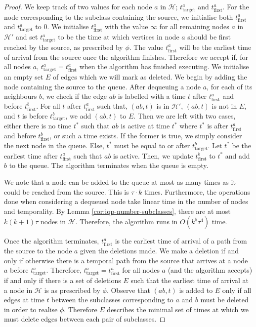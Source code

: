 \documentclass[preprint,12pt]{elsarticle}
\begin{document}
\begin{proof}
    We keep track of two values for each node $a$ in $\mathcal{H}$; $t^a_{\text{target}}$ and $t_{\text{first}}^a$. For the node corresponding to the subclass containing the source, we initialise both $t_{\text{first}}^a$ and $t_{\text{target}}^a$ to $0$. We initialise $t_{\text{first}}^a$ with the value $\infty$ for all remaining nodes $a$ in $\mathcal{H}'$ and set $t_{\text{target}}^a$ to be the time at which vertices in node $a$ should be first reached by the source, as prescribed by $\phi$. The value $t_{\text{first}}^a$ will be the earliest time of arrival from the source once the algorithm finishes. Therefore we accept if, for all nodes $a$, $t_{\text{target}}^a=t_{\text{first}}^a$ when the algorithm has finished executing. We initialise an empty set $E$ of edges which we will mark as deleted. We begin by adding the node containing the source to the queue. After dequeuing a node $a$, for each of its neighbours $b$, we check if the edge $ab$ is labelled with a time $t$ after $t_{\text{first}}^a$ and before $t_{\text{first}}^b$. For all $t$ after $t_{\text{first}}^a$ such that, $(ab,t)$ is in $\mathcal{H}'$, $(ab,t)$ is not in $E$, and $t$ is before $t_{\text{target}}^b$, we add $(ab,t)$ to $E$. Then we are left with two cases, either there is no time $t^*$ such that $ab$ is active at time $t^*$ where $t^*$ is after $t_{\text{first}}^a$ and before $t_{\text{first}}^b$, or such a time exists. If the former is true, we simply consider the next node in the queue. Else, $t^*$ must be equal to or after $t_{\text{target}}^b$. Let $t^*$ be the earliest time after $t_{\text{first}}^a$ such that $ab$ is active. Then, we update $t_{\text{first}}^b$ to $t^*$ and add $b$ to the queue. The algorithm terminates when the queue is empty.

    We note that a node can be added to the queue at most as many times as it could be reached from the source. This is $\tau \cdot k$ times. Furthermore, the operations done when considering a dequeued node take linear time in the number of nodes and temporality. By Lemma \ref{cor:iqp-number-subclasses}, there are at most $k(k+1)\tau$ nodes in $\mathcal{H}$. Therefore, the algorithm runs in $O(k^5\tau^4)$ time.

    Once the algorithm terminates, $t^a_{\text{first}}$ is the earliest time of arrival of a path from the source to the node $a$ given the deletions made. We make a deletion if and only if otherwise there is a temporal path from the source that arrives at a node $a$ before $t^a_{\text{target}}$. Therefore, $t^a_{\text{target}}=t^a_{\text{first}}$ for all nodes $a$ (and the algorithm accepts) if and only if there is a set of deletions $E$ such that the earliest time of arrival at a node in $\mathcal{H}$ is as prescribed by $\phi$. Observe that $(ab,t)$ is added to $E$ only if all edges at time $t$ between the subclasses corresponding to $a$ and $b$ must be deleted in order to realise $\phi$. Therefore $E$ describes the minimal set of times at which we must delete edges between each pair of subclasses.
\end{proof}
\end{document}
